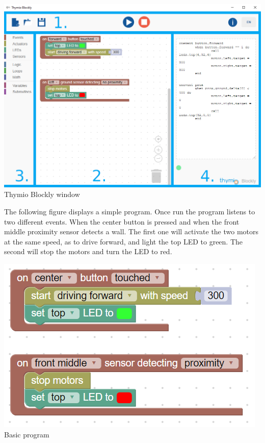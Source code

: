 \documentclass{scrreprt}
\begin{document}
\begin{center}
  \includegraphics[scale=0.5]{./Blockly/blockly_window}\\
  Thymio Blockly window
\end{center}

The following figure displays a simple program. Once run the program listens to two different events. When the center button is pressed and when the front middle proximity sensor detects a wall. 
The first one will activate the two motors at the same speed, as to drive forward, and light the top LED to green. The second will stop the motors and turn the LED to red. \\
\begin{center}
  \includegraphics[scale=0.5]{./Blockly/forward_stop_wall}\\
  Basic program
\end{center}
\end{document}
